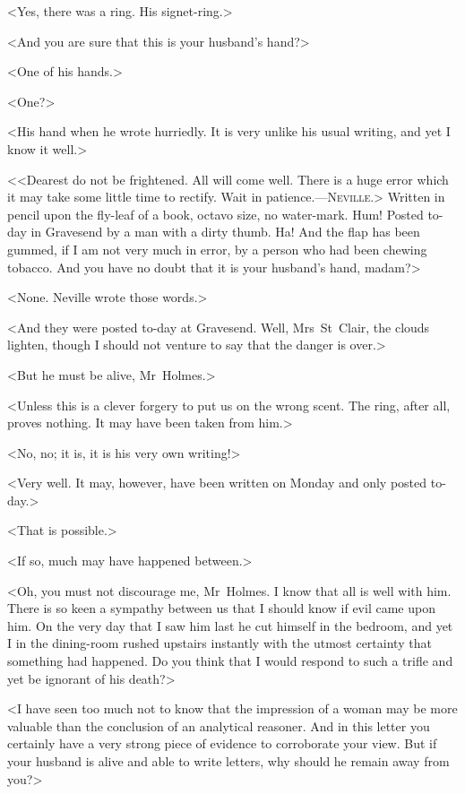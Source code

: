 <Yes, there was a ring. His signet-ring.>

<And you are sure that this is your husband's hand?>

<One of his hands.>

<One?>

<His hand when he wrote hurriedly. It is very unlike his usual writing, and yet I know it well.>

<<Dearest do not be frightened. All will come well. There is a huge error which it may take some little time to rectify. Wait in patience.—\textsc{Neville}.> Written in pencil upon the fly-leaf of a book, octavo size, no water-mark. Hum! Posted to-day in Gravesend by a man with a dirty thumb. Ha! And the flap has been gummed, if I am not very much in error, by a person who had been chewing tobacco. And you have no doubt that it is your husband's hand, madam?>

<None. Neville wrote those words.>

<And they were posted to-day at Gravesend. Well, Mrs~St~Clair, the clouds lighten, though I should not venture to say that the danger is over.>

<But he must be alive, Mr~Holmes.>

<Unless this is a clever forgery to put us on the wrong scent. The ring, after all, proves nothing. It may have been taken from him.>

<No, no; it is, it is his very own writing!>

<Very well. It may, however, have been written on Monday and only posted to-day.>

<That is possible.>

<If so, much may have happened between.>

<Oh, you must not discourage me, Mr~Holmes. I know that all is well with him. There is so keen a sympathy between us that I should know if evil came upon him. On the very day that I saw him last he cut himself in the bedroom, and yet I in the dining-room rushed upstairs instantly with the utmost certainty that something had happened. Do you think that I would respond to such a trifle and yet be ignorant of his death?>

<I have seen too much not to know that the impression of a woman may be more valuable than the conclusion of an analytical reasoner. And in this letter you certainly have a very strong piece of evidence to corroborate your view. But if your husband is alive and able to write letters, why should he remain away from you?>

